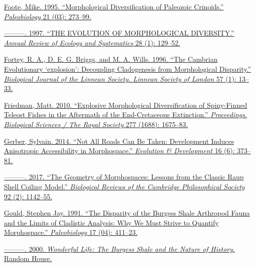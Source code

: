 \href{http://paperpile.com/b/sTGYvp/fTJ3}{Foote, Mike. 1995.
``Morphological Diversification of Paleozoic Crinoids.''
}\href{http://paperpile.com/b/sTGYvp/fTJ3}{\emph{Paleobiology}}\href{http://paperpile.com/b/sTGYvp/fTJ3}{
21 (03): 273--99.}

\href{http://paperpile.com/b/sTGYvp/yqPw}{---------. 1997. ``THE
EVOLUTION OF MORPHOLOGICAL DIVERSITY.''
}\href{http://paperpile.com/b/sTGYvp/yqPw}{\emph{Annual Review of
Ecology and Systematics}}\href{http://paperpile.com/b/sTGYvp/yqPw}{ 28
(1): 129--52.}

\href{http://paperpile.com/b/sTGYvp/2tbJ}{Fortey, R. A., D. E. G.
Briggs, and M. A. Wills. 1996. ``The Cambrian Evolutionary `explosion':
Decoupling Cladogenesis from Morphological Disparity.''
}\href{http://paperpile.com/b/sTGYvp/2tbJ}{\emph{Biological Journal of
the Linnean Society. Linnean Society of
London}}\href{http://paperpile.com/b/sTGYvp/2tbJ}{ 57 (1): 13--33.}

\href{http://paperpile.com/b/sTGYvp/EETc}{Friedman, Matt. 2010.
``Explosive Morphological Diversification of Spiny-Finned Teleost Fishes
in the Aftermath of the End-Cretaceous Extinction.''
}\href{http://paperpile.com/b/sTGYvp/EETc}{\emph{Proceedings. Biological
Sciences / The Royal Society}}\href{http://paperpile.com/b/sTGYvp/EETc}{
277 (1688): 1675--83.}

\href{http://paperpile.com/b/sTGYvp/SJbC}{Gerber, Sylvain. 2014. ``Not
All Roads Can Be Taken: Development Induces Anisotropic Accessibility in
Morphospace.''
}\href{http://paperpile.com/b/sTGYvp/SJbC}{\emph{Evolution \&
Development}}\href{http://paperpile.com/b/sTGYvp/SJbC}{ 16 (6):
373--81.}

\href{http://paperpile.com/b/sTGYvp/QVvv}{---------. 2017. ``The
Geometry of Morphospaces: Lessons from the Classic Raup Shell Coiling
Model.'' }\href{http://paperpile.com/b/sTGYvp/QVvv}{\emph{Biological
Reviews of the Cambridge Philosophical
Society}}\href{http://paperpile.com/b/sTGYvp/QVvv}{ 92 (2): 1142--55.}

\href{http://paperpile.com/b/sTGYvp/CidX}{Gould, Stephen Jay. 1991.
``The Disparity of the Burgess Shale Arthropod Fauna and the Limits of
Cladistic Analysis: Why We Must Strive to Quantify Morphospace.''
}\href{http://paperpile.com/b/sTGYvp/CidX}{\emph{Paleobiology}}\href{http://paperpile.com/b/sTGYvp/CidX}{
17 (04): 411--23.}

\href{http://paperpile.com/b/sTGYvp/Uns3}{---------. 2000.
}\href{http://paperpile.com/b/sTGYvp/Uns3}{\emph{Wonderful Life: The
Burgess Shale and the Nature of
History}}\href{http://paperpile.com/b/sTGYvp/Uns3}{. Random House.}

